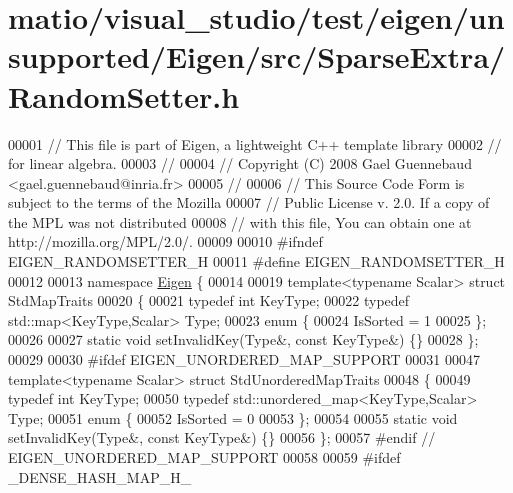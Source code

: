 \hypertarget{matio_2visual__studio_2test_2eigen_2unsupported_2_eigen_2src_2_sparse_extra_2_random_setter_8h_source}{}\section{matio/visual\+\_\+studio/test/eigen/unsupported/\+Eigen/src/\+Sparse\+Extra/\+Random\+Setter.h}
\label{matio_2visual__studio_2test_2eigen_2unsupported_2_eigen_2src_2_sparse_extra_2_random_setter_8h_source}

\begin{DoxyCode}
00001 \textcolor{comment}{// This file is part of Eigen, a lightweight C++ template library}
00002 \textcolor{comment}{// for linear algebra.}
00003 \textcolor{comment}{//}
00004 \textcolor{comment}{// Copyright (C) 2008 Gael Guennebaud <gael.guennebaud@inria.fr>}
00005 \textcolor{comment}{//}
00006 \textcolor{comment}{// This Source Code Form is subject to the terms of the Mozilla}
00007 \textcolor{comment}{// Public License v. 2.0. If a copy of the MPL was not distributed}
00008 \textcolor{comment}{// with this file, You can obtain one at http://mozilla.org/MPL/2.0/.}
00009 
00010 \textcolor{preprocessor}{#ifndef EIGEN\_RANDOMSETTER\_H}
00011 \textcolor{preprocessor}{#define EIGEN\_RANDOMSETTER\_H}
00012 
00013 \textcolor{keyword}{namespace }\hyperlink{namespace_eigen}{Eigen} \{ 
00014 
00019 \textcolor{keyword}{template}<\textcolor{keyword}{typename} Scalar> \textcolor{keyword}{struct }StdMapTraits
00020 \{
00021   \textcolor{keyword}{typedef} \textcolor{keywordtype}{int} KeyType;
00022   \textcolor{keyword}{typedef} std::map<KeyType,Scalar> Type;
00023   \textcolor{keyword}{enum} \{
00024     IsSorted = 1
00025   \};
00026 
00027   \textcolor{keyword}{static} \textcolor{keywordtype}{void} setInvalidKey(Type&, \textcolor{keyword}{const} KeyType&) \{\}
00028 \};
00029 
00030 \textcolor{preprocessor}{#ifdef EIGEN\_UNORDERED\_MAP\_SUPPORT}
00031 
00047 \textcolor{keyword}{template}<\textcolor{keyword}{typename} Scalar> \textcolor{keyword}{struct }StdUnorderedMapTraits
00048 \{
00049   \textcolor{keyword}{typedef} \textcolor{keywordtype}{int} KeyType;
00050   \textcolor{keyword}{typedef} std::unordered\_map<KeyType,Scalar> Type;
00051   \textcolor{keyword}{enum} \{
00052     IsSorted = 0
00053   \};
00054 
00055   \textcolor{keyword}{static} \textcolor{keywordtype}{void} setInvalidKey(Type&, \textcolor{keyword}{const} KeyType&) \{\}
00056 \};
00057 \textcolor{preprocessor}{#endif // EIGEN\_UNORDERED\_MAP\_SUPPORT}
00058 
00059 \textcolor{preprocessor}{#ifdef \_DENSE\_HASH\_MAP\_H\_}

\end{DoxyCode}
